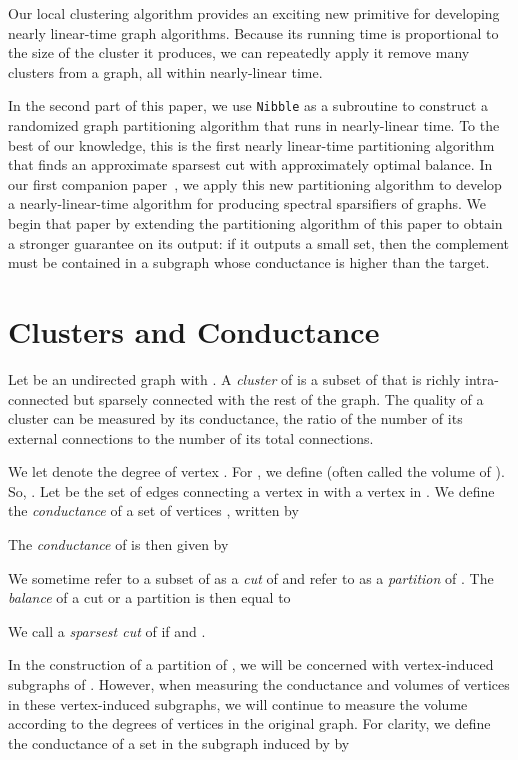 \documentclass[11pt]{article}
\begin{document}
Our local clustering algorithm provides an exciting new
  primitive for developing nearly linear-time graph algorithms.
Because its running time is proportional to the size of
  the cluster it produces, we can repeatedly apply it
  remove many clusters from a graph, all within nearly-linear time.

In the second part of this paper,
  we use  \texttt{Nibble}  as a subroutine to
  construct a randomized graph partitioning
  algorithm that runs in nearly-linear time.
To the best of our knowledge, this is the first nearly linear-time
  partitioning algorithm that finds an approximate sparsest cut
  with approximately optimal balance.
In our first companion paper~\cite{SpielmanTengSparsifier}, we apply this new
  partitioning algorithm to develop a
  nearly-linear-time algorithm for producing spectral sparsifiers of graphs.
We begin that paper by extending the partitioning algorithm of this paper
  to obtain a stronger guarantee on its output: if it outputs a small set,
  then the complement must be contained in a subgraph whose conductance is
  higher than the target.

\section{Clusters and Conductance}\label{sec:Def}

Let   be an undirected graph  with .
A {\em cluster} of  is a subset of  that is
  richly intra-connected but sparsely connected
  with the rest of the graph.
The quality of a cluster can be measured by its conductance,
  the ratio of the number of its external connections to
  the number of its total connections.

We let  denote the degree of vertex .
For , we define 
  (often called the volume of ).
So, .
Let  be the set of edges connecting a vertex in
   with a vertex in .
We define the {\em conductance} of a set of vertices , written
   by

The {\em conductance} of  is then given by


We sometime refer to a subset  of  as a {\em cut} of 
  and refer to  as a {\em partition} of .
The {\em balance} of a cut  or a partition  is then equal to
  
We call  a \textit{sparsest cut}
  of  if  and .

In the construction of a partition of , we will be concerned with
  vertex-induced subgraphs of .
However, when measuring the conductance and volumes of vertices in
  these vertex-induced subgraphs, we will continue to measure the
  volume according to the degrees of vertices in the original graph.
For clarity, we define the conductance of a set  in the subgraph induced
  by  by
\end{document}
